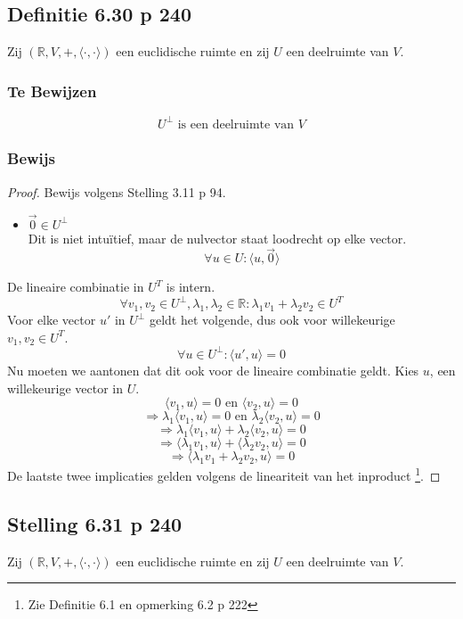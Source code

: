 \documentclass[lineaire_algebra_oplossingen.tex]{subfiles}
\begin{document}
\subsection{Definitie 6.30 p 240}
Zij $(\mathbb{R}, V,+, \langle \cdot,\cdot \rangle)$ een euclidische ruimte en zij $U$ een deelruimte van $V$.
\subsubsection*{Te Bewijzen}
\[
U^\bot \text{ is een deelruimte van } V
\]
\subsubsection*{Bewijs}
\begin{proof}
Bewijs volgens Stelling 3.11 p 94.
\begin{itemize}
\item $\vec{0} \in U^\bot$\\
Dit is niet intu\"itief, maar de nulvector staat loodrecht op elke vector.
\[
\forall u \in U: \langle u, \vec{0} \rangle
\]
\end{itemize}

\item De lineaire combinatie in $U^T$ is intern.
\[
\forall v_1,v_2\in U^\bot, \lambda_1,\lambda_2 \in \mathbb{R} : \lambda_1v_1 + \lambda_2v_2 \in U^T
\]
Voor elke vector $u'$ in $U^\bot$ geldt het volgende, dus ook voor willekeurige $v_1,v_2\in U^T$.
\[
\forall u\in U^\bot: \langle u',u\rangle = 0
\]
Nu moeten we aantonen dat dit ook voor de lineaire combinatie geldt. Kies $u$, een willekeurige vector in $U$.
\[
\langle v_1,u\rangle = 0 \text{ en } \langle v_2,u\rangle = 0
\]
\[
\Rightarrow
\lambda_1\langle v_1,u\rangle = 0 \text{ en } \lambda_2\langle v_2,u\rangle = 0
\]
\[
\Rightarrow
\lambda_1\langle v_1,u\rangle + \lambda_2\langle v_2,u\rangle = 0
\]
\[
\Rightarrow
\langle \lambda_1v_1,u\rangle + \langle \lambda_2v_2,u\rangle = 0
\]
\[
\Rightarrow
\langle \lambda_1v_1 + \lambda_2v_2,u\rangle = 0
\]
De laatste twee implicaties gelden volgens de lineariteit van het inproduct \footnote{Zie Definitie 6.1 en opmerking 6.2 p 222}.
\end{proof}

\subsection{Stelling 6.31 p 240}
Zij $(\mathbb{R}, V,+, \langle \cdot,\cdot \rangle)$ een euclidische ruimte en zij $U$ een deelruimte van $V$.
\end{document}

